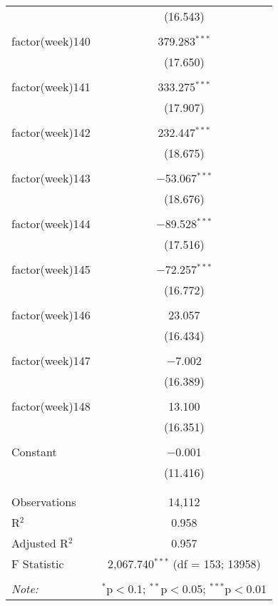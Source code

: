 \documentclass[twoside,twocolumn]{article}
\begin{document}
\begin{table}[!htbp]
\begin{tabular}{@{\extracolsep{5pt}}lc}
  & (16.543) \\ 
  & \\ 
 factor(week)140 & 379.283$^{***}$ \\ 
  & (17.650) \\ 
  & \\ 
 factor(week)141 & 333.275$^{***}$ \\ 
  & (17.907) \\ 
  & \\ 
 factor(week)142 & 232.447$^{***}$ \\ 
  & (18.675) \\ 
  & \\ 
 factor(week)143 & $-$53.067$^{***}$ \\ 
  & (18.676) \\ 
  & \\ 
 factor(week)144 & $-$89.528$^{***}$ \\ 
  & (17.516) \\ 
  & \\ 
 factor(week)145 & $-$72.257$^{***}$ \\ 
  & (16.772) \\ 
  & \\ 
 factor(week)146 & 23.057 \\ 
  & (16.434) \\ 
  & \\ 
 factor(week)147 & $-$7.002 \\ 
  & (16.389) \\ 
  & \\ 
 factor(week)148 & 13.100 \\ 
  & (16.351) \\ 
  & \\ 
 Constant & $-$0.001 \\ 
  & (11.416) \\ 
  & \\ 
\hline \\[-1.8ex] 
Observations & 14,112 \\ 
R$^{2}$ & 0.958 \\ 
Adjusted R$^{2}$ & 0.957 \\ 
F Statistic & 2,067.740$^{***}$ (df = 153; 13958) \\ 
\hline 
\hline \\[-1.8ex] 
\textit{Note:}  & \multicolumn{1}{r}{$^{*}$p$<$0.1; $^{**}$p$<$0.05; $^{***}$p$<$0.01} \\ 
\end{tabular} 
\end{table} 
\end{document}
